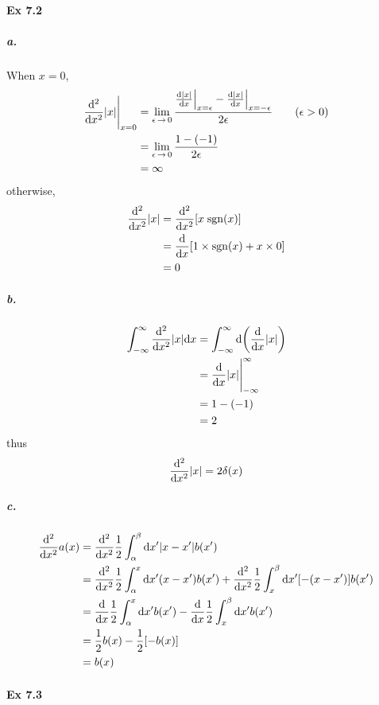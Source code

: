 \documentclass[a4paper]{article}
\DeclareMathOperator{\intdinf}{\int_{-\infty}^\infty}
\DeclareMathOperator{\ra}{\rightarrow}
\newcommand{\ex}[1]{\paragraph{Ex #1}}
\newcommand{\subex}[1]{\subparagraph{#1}}
\numberwithin{equation}{subsection}
\begin{document}
\ex{7.2}
\subex{a.}
When $ x=0 $,
\begin{align}
\dv[2]{x} \abs{x} \Bigg|_{x=0} &= \lim_{\epsilon\ra 0} \dfrac{\dv{\abs{x}}{x}\Big|_{x=\epsilon} - \dv{\abs{x}}{x}\Big|_{x=-\epsilon}}{2\epsilon} \qquad (\epsilon>0)\notag\\
&= \lim_{\epsilon\ra 0} \dfrac{1 - (-1)}{2\epsilon} \notag\\
&= \infty
\end{align}
otherwise,
\begin{align}
\dv[2]{x} \abs{x}  &= \dv[2]{x} [x \;\mathrm{sgn}(x)] \notag\\
&= \dv{x} [1\times \mathrm{sgn}(x) + x\times 0] \notag\\
&= 0
\end{align}
\subex{b.}
\begin{align}\label{key}
\intdinf \dv[2]{x} \abs{x} \dd x &= \intdinf \dd(\dv{x} \abs{x}) \notag\\
&= \dv{x} \abs{x} \Bigg|_{-\infty}^{\infty} \notag\\
&= 1 - (-1) \notag\\
&= 2
\end{align}
thus
\begin{equation}\label{key}
\dv[2]{x} \abs{x} = 2\delta(x)
\end{equation}
\subex{c.}
\begin{align}
\dv[2]{x} a(x) &= \dv[2]{x} \dfrac{1}{2}\int_\alpha^\beta \dd x' 
\abs{x - x'} b(x') \notag\\
&= \dv[2]{x} \dfrac{1}{2}\int_\alpha^x \dd x' 
(x - x') b(x') + \dv[2]{x} \dfrac{1}{2}\int_x^\beta \dd x' 
[-(x - x')] b(x') \notag\\
&= \dv{x} \dfrac{1}{2}\int_\alpha^x \dd x' 
 b(x') - \dv{x} \dfrac{1}{2}\int_x^\beta \dd x' b(x') \notag\\
&= \dfrac{1}{2}b(x) - \dfrac{1}{2} [-b(x)] \notag\\
&= b(x)
\end{align}

\ex{7.3}
\end{document}
